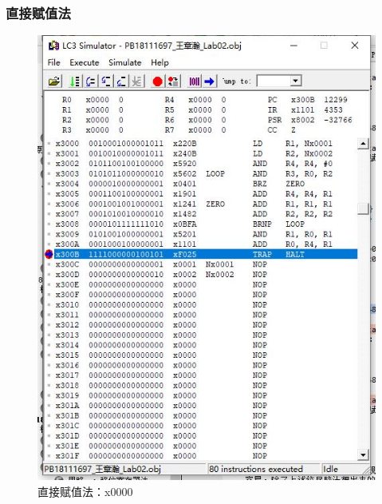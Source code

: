 \documentclass[UTF8]{article}
\begin{document}
	\subsubsection{直接赋值法}
	\begin{figure}[H]
		\begin{minipage}[H]{0.48\linewidth}
			\centering
			\includegraphics[scale=0.4]{x0000_2.jpg}
			\caption{直接赋值法：x0000}
			\label{x0000_2}
		\end{minipage}
		\qquad
		\begin{minipage}[H]{0.48\linewidth}
			\centering

\end{minipage}
\end{figure}
\end{document}
